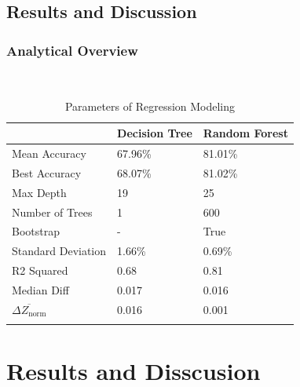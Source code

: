 \documentclass{beamer}
\begin{document}
\subsection{Results and Discussion}

\begin{frame}
	\frametitle{Analytical Overview}
    \begin{table}[ht]\
        \caption*{Parameters of Regression Modeling} %
        \centering %
        \begin{tabular}{l l l} %
        \hline\hline %
         &Decision Tree & Random Forest\\ [0.5ex] %
        \hline %
        Mean Accuracy& 67.96\%  & 81.01\%  \\ %
        Best Accuracy & 68.07\% & 81.02\%  \\
        Max Depth & 19 & 25  \\
        Number of Trees &  1 & 600  \\
        Bootstrap &  - & True  \\
        Standard Deviation &   1.66\% & 0.69\%  \\
        R2 Squared &  0.68 & 0.81  \\
        Median Diff &  0.017 & 0.016  \\ %
        $\overline{\Delta Z_{\text {norm}}}$ &  0.016 & 0.001  \\ [1ex] %
        \hline %
        \\
        \end{tabular}
        \end{table}
        \end{frame}
\section{Results and Disscusion}
\end{document}

